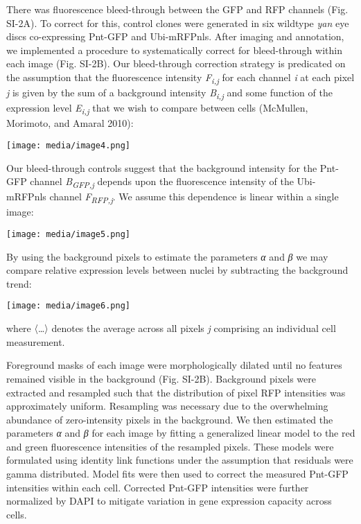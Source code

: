 There was fluorescence bleed-through between the GFP and RFP channels (Fig. SI-2A). To correct for this, control clones were generated in six wildtype \emph{yan} eye discs co-expressing Pnt-GFP and Ubi-mRFPnls. After imaging and annotation, we implemented a procedure to systematically correct for bleed-through within each image (Fig. SI-2B). Our bleed-through correction strategy is predicated on the assumption that the fluorescence intensity \emph{F\textsubscript{i,j}} for each channel \emph{i} at each pixel \emph{j} is given by the sum of a background intensity \emph{B\textsubscript{i,j}} and some function of the expression level \emph{E\textsubscript{i,j}} that we wish to compare between cells (McMullen, Morimoto, and Amaral 2010):

\texttt{[image: media/image4.png]}

Our bleed-through controls suggest that the background intensity for the Pnt-GFP channel \emph{B\textsubscript{GFP,j}} depends upon the fluorescence intensity of the Ubi-mRFPnls channel \emph{F\textsubscript{RFP,j}}. We assume this dependence is linear within a single image:

\texttt{[image: media/image5.png]}

By using the background pixels to estimate the parameters \emph{α} and \emph{β} we may compare relative expression levels between nuclei by subtracting the background trend:

\texttt{[image: media/image6.png]}

where 〈\ldots{}〉 denotes the average across all pixels \emph{j} comprising an individual cell measurement.

Foreground masks of each image were morphologically dilated until no features remained visible in the background (Fig. SI-2B). Background pixels were extracted and resampled such that the distribution of pixel RFP intensities was approximately uniform. Resampling was necessary due to the overwhelming abundance of zero-intensity pixels in the background. We then estimated the parameters \emph{α} and \emph{β} for each image by fitting a generalized linear model to the red and green fluorescence intensities of the resampled pixels. These models were formulated using identity link functions under the assumption that residuals were gamma distributed. Model fits were then used to correct the measured Pnt-GFP intensities within each cell. Corrected Pnt-GFP intensities were further normalized by DAPI to mitigate variation in gene expression capacity across cells.

